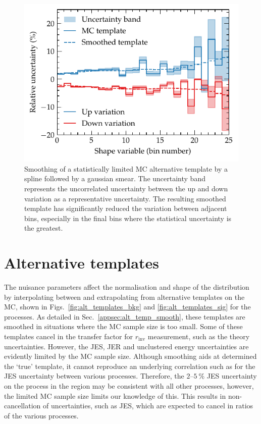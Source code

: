 \begin{figure}
    \centering
    \includegraphics{appendices/100_appendices/images/smoothing_example.pdf}
    \caption[Example of MC alternative template smoothing.]{
        Smoothing of a statistically limited MC alternative template by a spline followed by a gaussian smear. The uncertainty band represents the uncorrelated uncertainty between the up and down variation as a representative uncertainty. The resulting smoothed template has significantly reduced the variation between adjacent bins, especially in the final bins where the statistical uncertainty is the greatest.
    }
    \label{fig:smoothing_example}
\end{figure}



\section{Alternative templates}\label{appsec:alt_temp}

The nuisance parameters affect the normalisation and shape of the \recoil distribution by interpolating between and extrapolating from alternative templates on the MC, shown in Figs.~\ref{fig:alt_templates_bkg} and \ref{fig:alt_templates_sig} for the \IVj processes. As detailed in Sec.~\ref{appsec:alt_temp_smooth}, these templates are smoothed in situations where the MC sample size is too small. Some of these templates cancel in the transfer factor for $r_{\mathrm{inv}}$ measurement, such as the theory uncertainties. However, the JES, JER and unclustered energy uncertainties are evidently limited by the MC sample size. Although smoothing aids at determined the `true' template, it cannot reproduce an underlying correlation such as for the JES uncertainty between various processes. Therefore, the {$2$--$\SI{5}{\%}$} JES uncertainty on the \IZvvj process in the \metplusjets region may be consistent with all other processes, however, the limited MC sample size limits our knowledge of this. This results in non-cancellation of uncertainties, such as JES, which are expected to cancel in ratios of the various \IVj processes.

